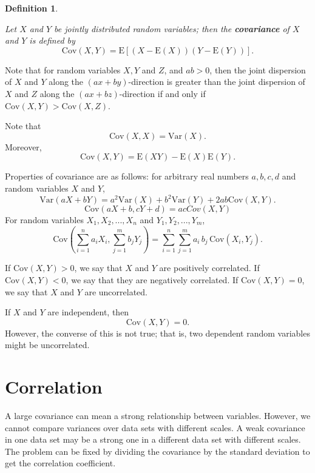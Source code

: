 \documentclass[landscape, 20pt]{extreport}
\theoremstyle{definition}
\newtheorem{definition}{Definition}[chapter]
\theoremstyle{definition}
\theoremstyle{definition}
\theoremstyle{definition}
\theoremstyle{remark}
\begin{document}
\begin{definition}
\protect\hypertarget{def:unlabeled-div-26}{}\label{def:unlabeled-div-26}

\emph{Let \(X\) and \(Y\) be jointly distributed random
variables; then the \textbf{covariance} of \(X\) and \(Y\) is defined by
\[\mathrm{Cov}(X,Y) =  \mathrm{E}[(X - \mathrm{E}(X))(Y - \mathrm{E}(Y))].\]}

\end{definition}

Note that for random variables \(X, Y\) and \(Z\), and \(ab > 0\), then the
joint dispersion of \(X\) and \(Y\) along the \((ax + by)\)-direction is
greater than the joint dispersion of \(X\) and \(Z\) along the
\((ax + bz)\)-direction if and only if
\(\mathrm{Cov}(X, Y) > \mathrm{Cov}(X,Z).\)

Note that \[\mathrm{Cov}(X, X) = \mathrm{Var}(X).\] Moreover,
\[\mathrm{Cov}(X,Y) = \mathrm{E}(XY) - \mathrm{E}(X)\mathrm{E}(Y).\]

Properties of covariance are as follows: for arbitrary real numbers
\(a, b, c, d\) and random variables \(X\) and \(Y\),
\[\mathrm{Var}(aX + bY) = a^2 \mathrm{Var}(X) + b^2 \mathrm{Var}(Y) + 2 a b \mathrm{Cov}(X,Y).\]
\[\mathrm{Cov}(aX + b, cY + d) = acCov(X, Y)\] For random variables
\(X_1, X_2, . . . , X_n\) and \(Y_1, Y_2, . . . , Y_m\),
\[\mathrm{Cov}(\sum_{i=1}^n a_i X_i, \sum_{j=1}^m b_j Y_j) = \sum_{i=1}^n\sum_{j=1}^m a_i\,b_j\, \mathrm{Cov}(X_i,Y_j).\]

If \(\mathrm{Cov}(X, Y) > 0\), we say that \(X\) and \(Y\) are positively
correlated. If \(\mathrm{Cov}(X, Y) < 0\), we say that they are negatively
correlated. If \(\mathrm{Cov}(X, Y) = 0\), we say that \(X\) and \(Y\) are
uncorrelated.

If \(X\) and \(Y\) are independent, then \[\mathrm{Cov}(X,Y) = 0.\] However,
the converse of this is not true; that is, two dependent random
variables might be uncorrelated.

\hypertarget{correlation}{%
\section{Correlation}\label{correlation}}

A large covariance can mean a strong relationship between variables.
However, we cannot compare variances over data sets with different
scales. A weak covariance in one data set may be a strong one in a
different data set with different scales. The problem can be fixed by
dividing the covariance by the standard deviation to get the correlation
coefficient.
\end{document}
